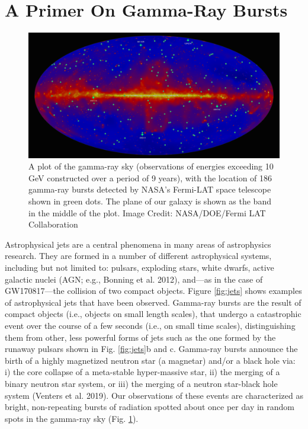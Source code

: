 \documentclass[1.5,11pt]{beavtex}
\begin{document}
\clearpage

\section{A Primer On Gamma-Ray Bursts}
\label{ch:Astro theory sec:GRBs}

\begin{figure}[h!]
  \centering
  \includegraphics[scale=0.20]{images/ch2/Fermi_LAT_GRBs.jpg}
  \caption{\selectfont A plot of the gamma-ray sky (observations of energies exceeding 10 GeV constructed over a period of 9 years), with the location of 186 gamma-ray bursts detected by NASA's Fermi-LAT space telescope shown in green dots. The plane of our galaxy is shown as the band in the middle of the plot. Image Credit: NASA/DOE/Fermi LAT Collaboration}
  \label{fig:GRBs Fermi-LAT}
\end{figure}

Astrophysical jets are a central phenomena in many areas of astrophysics research. They are formed in a number of different astrophysical systems, including but not limited to: pulsars, exploding stars, white dwarfs, active galactic nuclei (AGN; e.g., Bonning et al. 2012), and---as in the case of GW170817---the collision of two compact objects. Figure \ref{fig:jets} shows examples of astrophysical jets that have been observed. Gamma-ray bursts are the result of compact objects (i.e., objects on small length scales), that undergo a catastrophic event over the course of a few seconds (i.e., on small time scales), distinguishing them from other, less powerful forms of jets such as the one formed by the runaway pulsars shown in Fig. \ref{fig:jets}b and c. Gamma-ray bursts announce the birth of a highly magnetized neutron star (a magnetar) and/or a black hole via: i) the core collapse of a meta-stable hyper-massive star, ii) the merging of a binary neutron star system, or iii) the merging of a neutron star-black hole system (Venters et al. 2019). Our observations of these events are characterized as bright, non-repeating bursts of radiation spotted about once per day in random spots in the gamma-ray sky (Fig. \ref{fig:GRBs Fermi-LAT}).   
\end{document}
